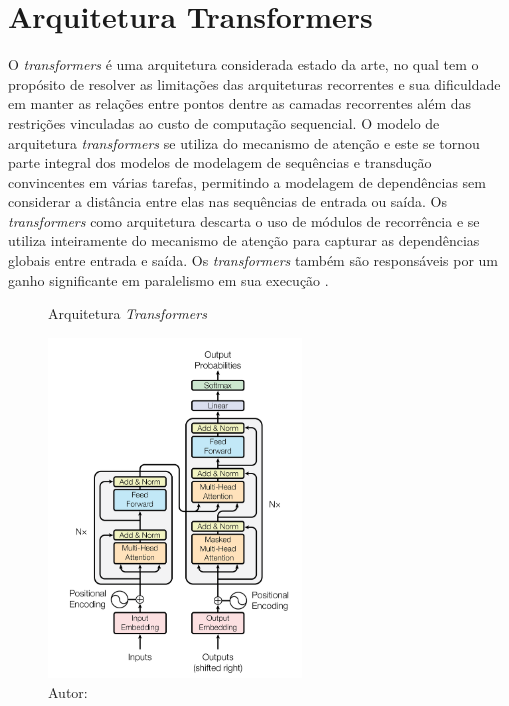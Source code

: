 \section{Arquitetura Transformers}

O \textit{transformers} é uma arquitetura considerada estado da arte, no qual tem o propósito de resolver as limitações das arquiteturas recorrentes e sua dificuldade em manter as relações entre pontos dentre as camadas recorrentes além das restrições vinculadas ao custo de computação sequencial. O modelo de arquitetura \textit{transformers} se utiliza do mecanismo de atenção e este se tornou parte integral dos modelos de modelagem de sequências e transdução convincentes em várias tarefas, permitindo a modelagem de dependências sem considerar a distância entre elas nas sequências de entrada ou saída. Os \textit{transformers} como arquitetura descarta o uso de módulos de recorrência e se utiliza inteiramente do mecanismo de atenção para capturar as dependências globais entre entrada e saída. Os \textit{transformers} também são responsáveis por um ganho significante em paralelismo em sua execução \cite{vaswaniAttentionAllYou2023}.

\begin{figure}[htbp]
    \centering
    \caption{Arquitetura \textit{Transformers}}
    \includegraphics[width=0.6\textwidth]{figures/fig004.png}
    \caption*{Autor: }
    \label{fig:fig004}
\end{figure}

